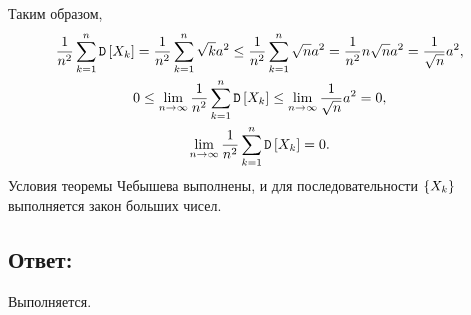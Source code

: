 Таким образом,
\begin{gather}
    \frac{1}{n^2} \sum_{k=1}^n \mathtt{D} \left [ X_k \right ]
    = \frac{1}{n^2} \sum_{k=1}^n \sqrt{k} a^2
    \le \frac{1}{n^2} \sum_{k=1}^n \sqrt{n} a^2
    = \frac{1}{n^2} n \sqrt{n} a^2
    = \frac{1}{\sqrt{n}} a^2 , \\
    0 \le
    \lim_{n \rightarrow \infty} \frac{1}{n^2} \sum_{k=1}^n \mathtt{D} \left [ X_k \right ]
    \le \lim_{n \rightarrow \infty} \frac{1}{\sqrt{n}} a^2 = 0, \\
    \lim_{n \rightarrow \infty} \frac{1}{n^2} \sum_{k=1}^n \mathtt{D} \left [ X_k \right ] = 0 .
\end{gather}
Условия теоремы Чебышева выполнены, и для последовательности $\left \{ X_k \right \}$ выполняется закон больших чисел.

\subsection*{Ответ:}
Выполняется.

